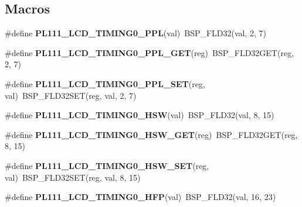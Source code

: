 \subsection*{Macros}
\begin{DoxyCompactItemize}
\item 
\mbox{\label{arm-pl111-regs_8h_a80b06b7efa2ddec80caae7926c3b092b}} 
\#define {\bfseries P\+L111\+\_\+\+L\+C\+D\+\_\+\+T\+I\+M\+I\+N\+G0\+\_\+\+P\+PL}(val)~B\+S\+P\+\_\+\+F\+L\+D32(val, 2, 7)
\item 
\mbox{\label{arm-pl111-regs_8h_ab14bf821bf3c32a8a166728e988dd390}} 
\#define {\bfseries P\+L111\+\_\+\+L\+C\+D\+\_\+\+T\+I\+M\+I\+N\+G0\+\_\+\+P\+P\+L\+\_\+\+G\+ET}(reg)~B\+S\+P\+\_\+\+F\+L\+D32\+G\+ET(reg, 2, 7)
\item 
\mbox{\label{arm-pl111-regs_8h_aae99460a9052b70600da7bc2ef183c67}} 
\#define {\bfseries P\+L111\+\_\+\+L\+C\+D\+\_\+\+T\+I\+M\+I\+N\+G0\+\_\+\+P\+P\+L\+\_\+\+S\+ET}(reg,  val)~B\+S\+P\+\_\+\+F\+L\+D32\+S\+ET(reg, val, 2, 7)
\item 
\mbox{\label{arm-pl111-regs_8h_a7c95cec6eca134792a1dbd310a6e1861}} 
\#define {\bfseries P\+L111\+\_\+\+L\+C\+D\+\_\+\+T\+I\+M\+I\+N\+G0\+\_\+\+H\+SW}(val)~B\+S\+P\+\_\+\+F\+L\+D32(val, 8, 15)
\item 
\mbox{\label{arm-pl111-regs_8h_ae726b52b3fec52a1c6923230a044e113}} 
\#define {\bfseries P\+L111\+\_\+\+L\+C\+D\+\_\+\+T\+I\+M\+I\+N\+G0\+\_\+\+H\+S\+W\+\_\+\+G\+ET}(reg)~B\+S\+P\+\_\+\+F\+L\+D32\+G\+ET(reg, 8, 15)
\item 
\mbox{\label{arm-pl111-regs_8h_add1e93ccb9e9058f1a8b2341ef72f248}} 
\#define {\bfseries P\+L111\+\_\+\+L\+C\+D\+\_\+\+T\+I\+M\+I\+N\+G0\+\_\+\+H\+S\+W\+\_\+\+S\+ET}(reg,  val)~B\+S\+P\+\_\+\+F\+L\+D32\+S\+ET(reg, val, 8, 15)
\item 
\mbox{\label{arm-pl111-regs_8h_aad18aab6d1a094f7cfecbd612e5aba4a}} 
\#define {\bfseries P\+L111\+\_\+\+L\+C\+D\+\_\+\+T\+I\+M\+I\+N\+G0\+\_\+\+H\+FP}(val)~B\+S\+P\+\_\+\+F\+L\+D32(val, 16, 23)
\item 
\mbox{\label{arm-pl111-regs_8h_accc4f594c9b19129f07a2116c2436567}} 

\end{DoxyCompactItemize}
